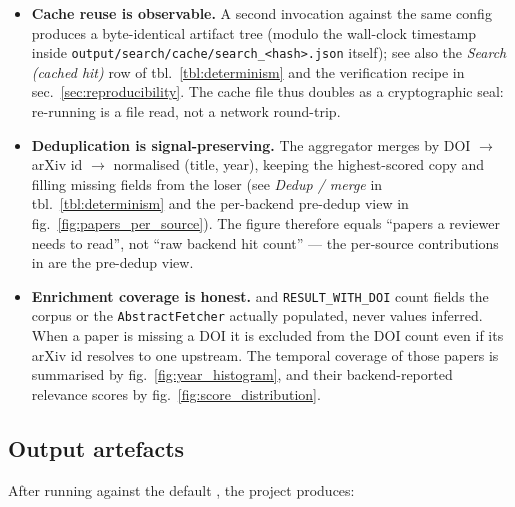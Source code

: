 \documentclass[
  english,
]{article}
\providecommand{\tightlist}{%
  \setlength{\itemsep}{0pt}\setlength{\parskip}{0pt}}
\begin{document}
\begin{itemize}
\tightlist
\item
  \textbf{Cache reuse is observable.} A second invocation against the
  same config produces a byte-identical artifact tree (modulo the
  wall-clock timestamp inside
  \texttt{output/search/cache/search\_\textless{}hash\textgreater{}.json}
  itself); see also the \emph{Search (cached hit)} row of
  tbl.~\ref{tbl:determinism} and the verification recipe in
  sec.~\ref{sec:reproducibility}. The cache file thus doubles as a
  cryptographic seal: re-running is a file read, not a network
  round-trip.
\item
  \textbf{Deduplication is signal-preserving.} The aggregator merges by
  DOI \texorpdfstring{\ensuremath{\to}}{->} arXiv id \texorpdfstring{\ensuremath{\to}}{->} normalised (title, year), keeping the highest-scored
  copy and filling missing fields from the loser (see \emph{Dedup /
  merge} in tbl.~\ref{tbl:determinism} and the per-backend pre-dedup
  view in fig.~\ref{fig:papers_per_source}). The
   figure therefore equals ``papers a
  reviewer needs to read'', not ``raw backend hit count'' --- the
  per-source contributions in  are the
  pre-dedup view.
\item
  \textbf{Enrichment coverage is honest.}
   and \texttt{RESULT\_WITH\_DOI} count
  fields the corpus or the \texttt{AbstractFetcher} actually populated,
  never values inferred. When a paper is missing a DOI it is excluded
  from the DOI count even if its arXiv id resolves to one upstream. The
  temporal coverage of those papers is summarised by
  fig.~\ref{fig:year_histogram}, and their backend-reported relevance
  scores by fig.~\ref{fig:score_distribution}.
\end{itemize}

\subsection{Output artefacts}\label{output-artefacts}

After running  against the
default , the project produces:
\end{document}
